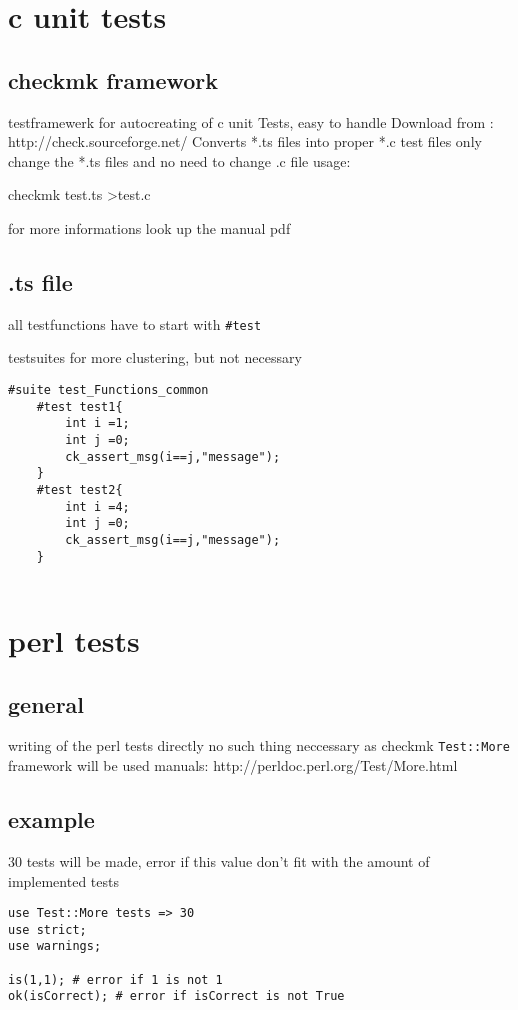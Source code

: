 \documentclass[openright,titlepage,numbers=noenddot,headinclude,%
                footinclude=true,abstractoff, %
                BCOR=5mm,paper=a4,fontsize=11pt,%
                ]{scrreprt}
\begin{document}
\chapter{c unit tests}
\section{checkmk framework}
testframewerk for autocreating of c unit Tests, easy to handle
Download from : http://check.sourceforge.net/
Converts *.ts files into proper *.c test files
only change the *.ts files and no need to change .c file
usage:
	
	checkmk test.ts \textgreater test.c

for more informations look up the manual pdf


\section{.ts file}

all testfunctions have to start with \texttt{\#test}

testsuites for more clustering, but not necessary

\begin{lstlisting}
#suite test_Functions_common
	#test test1{
		int i =1;
		int j =0;
		ck_assert_msg(i==j,"message");
	}
	#test test2{
		int i =4;
		int j =0;
		ck_assert_msg(i==j,"message");
	}
	
\end{lstlisting}



\chapter{perl tests}
\section{general}
writing of the perl tests directly no such thing neccessary as checkmk
\texttt{Test::More} framework will be used
manuals: http://perldoc.perl.org/Test/More.html

\section{example}
30 tests will be made, error if this value don't fit with the amount of implemented tests

\begin{lstlisting}
use Test::More tests => 30  
use strict;
use warnings;

is(1,1); # error if 1 is not 1
ok(isCorrect); # error if isCorrect is not True

\end{lstlisting}
\end{document}
